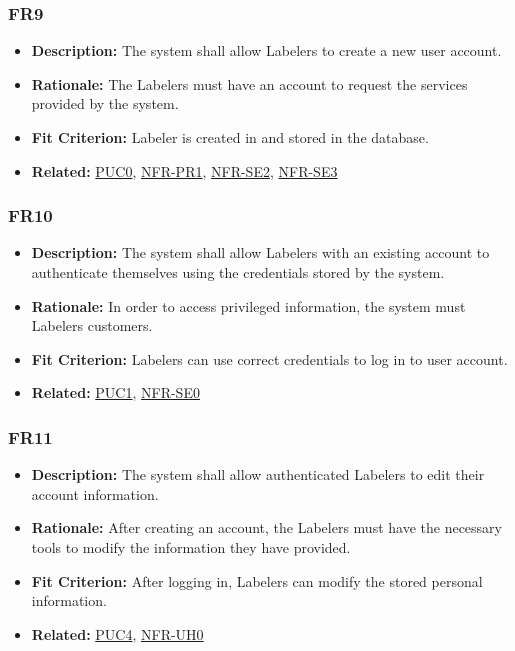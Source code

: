 \documentclass[12pt]{article}
\begin{document}
\subsubsection*{FR9}
\label{sec:FR9}
\begin{itemize}
  \item \textbf{Description:} The system shall allow Labelers to create a new user account.
  \item \textbf{Rationale:} The Labelers must have an account to request the services provided by the system.
  \item \textbf{Fit Criterion:} Labeler is created in and stored in the database.
  \item \textbf{Related:} \hyperref[sec:PUC0]{PUC0}, \hyperref[sec:PR1]{NFR-PR1}, \hyperref[sec:SE2]{NFR-SE2}, \hyperref[sec:SE3]{NFR-SE3}
\end{itemize}
\subsubsection*{FR10}
\label{sec:FR10}
\begin{itemize}
  \item \textbf{Description:} The system shall allow Labelers with an existing account to authenticate themselves using the credentials stored by the system.
  \item \textbf{Rationale:} In order to access privileged information, the system must Labelers customers.
\item \textbf{Fit Criterion:} Labelers can use correct credentials to log in to user account.
\item \textbf{Related:} \hyperref[sec:PUC1]{PUC1}, \hyperref[sec:SE0]{NFR-SE0}
\end{itemize}
\subsubsection*{FR11}
\label{sec:FR11}
\begin{itemize}
  \item \textbf{Description:} The system shall allow authenticated Labelers to edit their account information.
  \item \textbf{Rationale:} After creating an account, the Labelers must have the necessary tools to modify the information they have provided.
  \item \textbf{Fit Criterion:} After logging in, Labelers can modify the stored personal information.
  \item \textbf{Related:}  \hyperref[sec:PUC4]{PUC4}, \hyperref[sec:UH0]{NFR-UH0}
\end{itemize}
\end{document}
